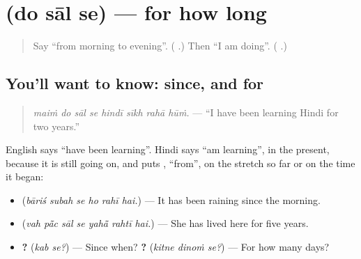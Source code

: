 \section[\texorpdfstring{\hi{दो} \hi{साल} \hi{से} (do sāl se)}{दो साल से (do sāl se)}]{   (do sāl se) — for how long}

\label{lesson:HI-C285-dosaalse}



\begin{quote}
Say \textquotedblleft{}from morning to evening\textquotedblright{}. (\textbf{   }.) Then \textquotedblleft{}I am doing\textquotedblright{}. (\textbf{   }.)
\end{quote}

\subsection*{You'll want to know: since, and for}
\begin{quote}
\textbf{       }
\end{quote}

\begin{quote}
\emph{maiṁ do sāl se hindī sīkh rahā hūṁ.} — \textquotedblleft{}I have been learning Hindi for two years.\textquotedblright{}
\end{quote}

English says \textquotedblleft{}have been learning\textquotedblright{}. Hindi says \textquotedblleft{}am learning\textquotedblright{}, in the present, because it is still going on, and puts \textbf{}, \textquotedblleft{}from\textquotedblright{}, on the stretch so far or on the time it began:

\begin{itemize}
\raggedright
  \item \textbf{     } (\emph{bāriś subah se ho rahī hai.}) — It has been raining since the morning.
  \item \textbf{      } (\emph{vah pā̃c sāl se yahā̃ rahtī hai.}) — She has lived here for five years.
  \item \textbf{ ?} (\emph{kab se?}) — Since when? \textbf{  ?} (\emph{kitne dinoṁ se?}) — For how many days?
\end{itemize}

